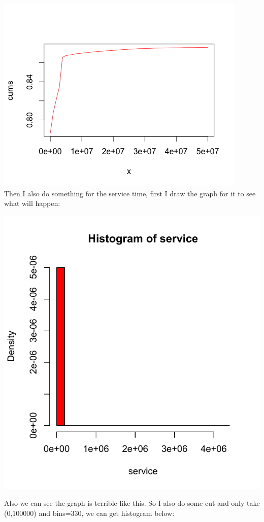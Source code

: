 \documentclass[11pt]{article}
\begin{document}
\includegraphics[scale=0.5]{1_cdf_inter_arrival.png} \\
Then I also do something for the service time, first I draw the graph for it to see what will happen: 
\begin{center}
\includegraphics[scale=0.5]{trace1_service1.pdf}
\end{center}
Also we can see the graph is terrible like this. So I also do some cut and only take (0,100000) and bins=330, we can get histogram below: \\
\end{document}
